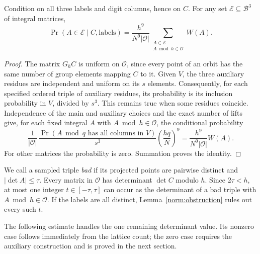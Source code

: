 \begin{lemma}\label{sam:lifting}
Condition on all three labels and digit columns, hence on $C$.  For any
set $\mathcal E\subseteq\mathcal B^3$ of integral matrices,
\begin{equation}\label{sam:crt-identity}
 \Pr(A\in\mathcal E\mid C,\text{labels})
 =\frac{h^9}{N^9|\mathcal O|}
   \sum_{\substack{A\in\mathcal E\\ A\bmod h\in\mathcal O}}W(A).
\end{equation}
\end{lemma}
\begin{proof}
The matrix $G_hC$ is uniform on $\mathcal O$, since every point of an orbit
has the same number of group elements mapping $C$ to it.  Given $V$, the
three auxiliary residues are independent and uniform on its $s$ elements.
Consequently, for each specified ordered triple of auxiliary residues,
its probability is its inclusion probability in $V$, divided by $s^3$.
This remains true when some residues coincide.  Independence of the main
and auxiliary choices and the exact number of lifts give, for each fixed
integral $A$ with $A\bmod h\in\mathcal O$, the conditional probability
\[
 \frac{1}{|\mathcal O|}\,
 \frac{\Pr(A\bmod q\text{ has all columns in }V)}{s^3}
 \left(\frac{hq}{N}\right)^9
 =\frac{h^9}{N^9|\mathcal O|}W(A).
\]
For other matrices the probability is zero.  Summation proves the identity.
\end{proof}

We call a sampled triple \emph{bad} if its projected points are pairwise
distinct and $|\det A|\le\tau$.  Every matrix in $\mathcal O$ has determinant
$\det C$ modulo $h$.  Since $2\tau<h$, at most one integer
$t\in[-\tau,\tau]$ can occur as the determinant of a bad triple with
$A\bmod h\in\mathcal O$.  If the labels are all distinct,
Lemma~\ref{norm:obstruction} rules out every such $t$.

The following estimate handles the one remaining determinant value.
Its nonzero case follows immediately from the lattice count; the zero
case requires the auxiliary construction and is proved in the next
section.

